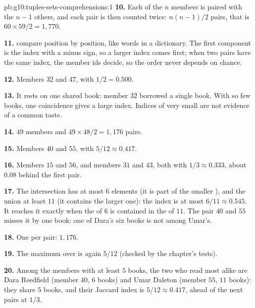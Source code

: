 \begin{solution}{pb:g10:tuples-sets-comprehensions:1}
\textbf{10.} Each of the $n$ members is paired with the $n - 1$ others, and each pair is then counted twice:
$n(n-1)/2$ pairs, that is $60 \times 59 / 2 = 1{,}770$.

\textbf{11.}  compare position by position, like words in a dictionary. The first component is the index with
a minus sign, so a larger index comes first; when two pairs have the same index, the member ids decide, so the order
never depends on chance.

\textbf{12.} Members $32$ and $47$, with $1/2 = 0.500$.

\textbf{13.} It rests on one shared book: member $32$ borrowed a single book. With so few books, one coincidence
gives a large index. Indices of very small  are not evidence of a common taste.

\textbf{14.} $49$ members and $49 \times 48 / 2 = 1{,}176$ pairs.

\textbf{15.} Members $40$ and $55$, with $5/12 \approx 0.417$.

\textbf{16.} Members $15$ and $56$, and members $31$ and $43$, both with $1/3 \approx 0.333$, about
$0.08$ behind the first pair.

\textbf{17.} The intersection has at most $6$ elements (it is part of the smaller ), and the union at least $11$
(it contains the larger one): the index is at most $6/11 \approx 0.545$. It reaches it exactly when the  of $6$ is
contained in the  of $11$. The pair $40$ and $55$ misses it by one book: one of Dara's six books is not among
Umar's.

\textbf{18.} One per pair: $1{,}176$.

\textbf{19.} The maximum over  is again $5/12$ (checked by the chapter's tests).

\textbf{20.} Among the members with at least $5$ books, the two who read most alike are Dara Reedfield (member $40$,
$6$ books) and Umar Daleton (member $55$, $11$ books): they share $5$ books, and their Jaccard index is
$5/12 \approx 0.417$, ahead of the next pairs at $1/3$.
\end{solution}
